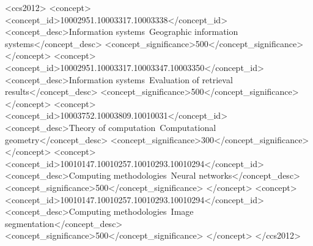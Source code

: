 \begin{CCSXML}
<ccs2012>
   <concept>
       <concept_id>10002951.10003317.10003338</concept_id>
       <concept_desc>Information systems~Geographic information systems</concept_desc>
       <concept_significance>500</concept_significance>
       </concept>
   <concept>
       <concept_id>10002951.10003317.10003347.10003350</concept_id>
       <concept_desc>Information systems~Evaluation of retrieval results</concept_desc>
       <concept_significance>500</concept_significance>
       </concept>
   <concept>
       <concept_id>10003752.10003809.10010031</concept_id>
       <concept_desc>Theory of computation~Computational geometry</concept_desc>
       <concept_significance>300</concept_significance>
       </concept>
   <concept>
       <concept_id>10010147.10010257.10010293.10010294</concept_id>
       <concept_desc>Computing methodologies~Neural networks</concept_desc>
       <concept_significance>500</concept_significance>
       </concept>
   <concept>
       <concept_id>10010147.10010257.10010293.10010294</concept_id>
       <concept_desc>Computing methodologies~Image segmentation</concept_desc>
       <concept_significance>500</concept_significance>
       </concept>
 </ccs2012>
\end{CCSXML}


